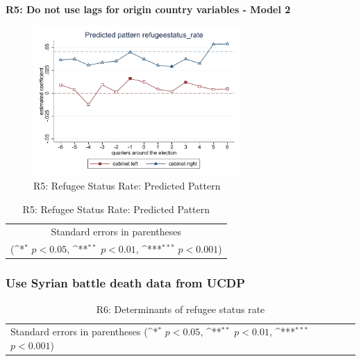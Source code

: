 \documentclass[10pt,a4paper]{scrartcl}
\begin{document}
\clearpage
\textbf{R5: Do not use lags for origin country variables - Model 2}
\begin{figure}[!ht]
	\centering
	\includegraphics[width=0.7\textwidth]{figures_edited/refugeestatus_rate_graph2_R5.pdf}
	\caption{R5: Refugee Status Rate: Predicted Pattern}
\end{figure}

\begin{table}[!ht]\centering
	\footnotesize
	\renewcommand{\arraystretch}{1.2}
	\def\sym#1{\ifmmode^{#1}\else\(^{#1}\)\fi}
	\caption{R5: Refugee Status Rate: Predicted Pattern}
	\begin{tabular}{l*{2}{c}}
		\hline\hline
		
		\hline\hline
		\multicolumn{3}{c}{\footnotesize Standard errors in parentheses} \\
		\multicolumn{3}{c}{\footnotesize (\sym{*} \(p<0.05\), \sym{**} \(p<0.01\), \sym{***} \(p<0.001\))} \\
	\end{tabular}
\end{table}




\clearpage
\FloatBarrier
\subsubsection{Use Syrian battle death data from UCDP}
\begin{table}[!ht]\centering
	\renewcommand{\arraystretch}{1.25}
	\small
	\def\sym#1{\ifmmode^{#1}\else\(^{#1}\)\fi}
	\caption{R6: Determinants of refugee status rate}
	\begin{tabular}{l*{3}{c}}
		\hline\hline
		
		\hline\hline
		\multicolumn{4}{l}{\footnotesize Standard errors in parentheses (\sym{*} \(p<0.05\), \sym{**} \(p<0.01\), \sym{***} \(p<0.001\))}\\
	\end{tabular}
\end{table}
\end{document}
